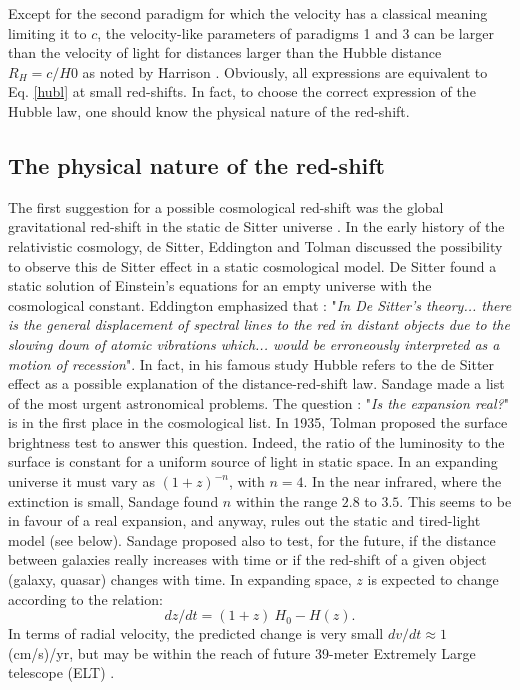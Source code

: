 Except for the second paradigm for which the velocity has a classical meaning limiting it to $c$, the velocity-like parameters of paradigms 1 and 3 can be larger than the velocity of light for distances larger than the Hubble distance $R_H=c/H0$ as noted by Harrison \cite{harrison1}.
Obviously, all expressions are equivalent to Eq. \ref{hubl} at small red-shifts. In fact, to choose the correct expression of the Hubble law, one should know the physical nature of the red-shift. 

\subsection{ The physical nature of the red-shift }
\label{sec4.2}
The first suggestion for a possible cosmological red-shift was the global gravitational red-shift in the static de Sitter universe \cite{ds1,ds2,ds3}.  In the early history of the relativistic cosmology, de Sitter, Eddington \cite{Ref45} and Tolman \cite{Ref46} discussed the possibility to observe this de Sitter effect in a static cosmological model. De Sitter found a static solution of Einstein's equations for an empty universe with the cosmological constant.
	Eddington emphasized that : "{\it{In De Sitter's theory... there is the general displacement of spectral lines to the red in distant objects due to the slowing down of atomic vibrations which... would be erroneously interpreted as a motion of recession}}". In fact, in his famous study Hubble \cite{edwin} refers to the de Sitter effect as a possible explanation of the distance-red-shift law.
Sandage  \cite{alan1} made a list of the most urgent astronomical problems.  The question : "{\it{Is the expansion real?}}"  is in the first place in the cosmological list.
In 1935, Tolman proposed the surface brightness test  to answer this question. Indeed, the ratio of the luminosity to the surface is constant for a uniform source of light in static space. In an expanding universe it must vary as $(1+z)^{-n}$, with $n=4$. In the near infrared, where the extinction is small, Sandage \cite{sbt} found $n$ within the range $2.8$ to $3.5$. This seems to be in favour of a real expansion, and anyway, rules out the static and tired-light model (see below).
Sandage proposed also to test, for the future, \cite{alan2} if the distance between galaxies really increases with time or if the red-shift of a given object (galaxy, quasar) changes with time. In expanding space, $z$ is expected to change according to the relation: 
\begin{equation}
dz/dt = (1+z) \ H_0 - H(z) .
\end{equation}
In terms of radial velocity, the predicted change is very small $dv/dt \approx 1$ (cm/s)/yr, but may be within the reach of future 39-meter Extremely Large telescope (ELT) \cite{elt}.

